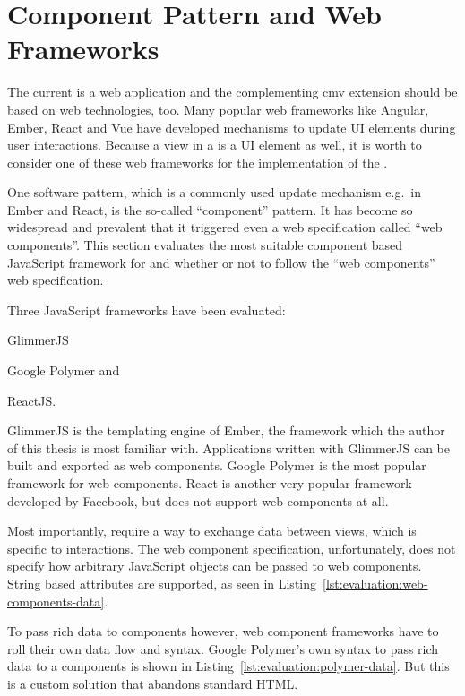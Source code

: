\section{Component Pattern and Web Frameworks}\label{sec:analysis:frontend-framework-comparison}

The current \visan{} is a web application and the complementing \gls{cmv} extension should be based on web technologies, too.
Many popular web frameworks like Angular, Ember, React and Vue have developed mechanisms to update UI elements during user interactions.
Because a view in a \cmv{} is a UI element as well, it is worth to consider one of these web frameworks for the implementation of the \cmv{}.

One software pattern, which is a commonly used update mechanism e.g.\ in Ember and React, is the so-called ``component'' pattern.
It has become so widespread and prevalent that it triggered even a web specification called “web components”.
This section evaluates the most suitable component based JavaScript framework for \cmvs{} and whether or not to follow the ``web components'' web specification.

Three JavaScript frameworks have been evaluated:
\begin{enumerate*}[label=(\arabic*)]
  \item GlimmerJS
  \item Google Polymer and
  \item ReactJS.
\end{enumerate*}
GlimmerJS is the templating engine of Ember, the framework which the author of this thesis is most familiar with.
Applications written with GlimmerJS can be built and exported as web components.
Google Polymer is the most popular framework for web components.
React is another very popular framework developed by Facebook, but does not support web components at all.

Most importantly, \cmvs{} require a way to exchange data between views, which is specific to interactions.
The web component specification, unfortunately, does not specify how arbitrary JavaScript objects can be passed to web components.
String based attributes are supported, as seen in Listing~\ref{lst:evaluation:web-components-data}.

To pass rich data to components however, web component frameworks have to roll their own data flow and syntax.
Google Polymer's own syntax to pass rich data to a components is shown in Listing~\ref{lst:evaluation:polymer-data}.
But this is a custom solution that abandons standard HTML.


